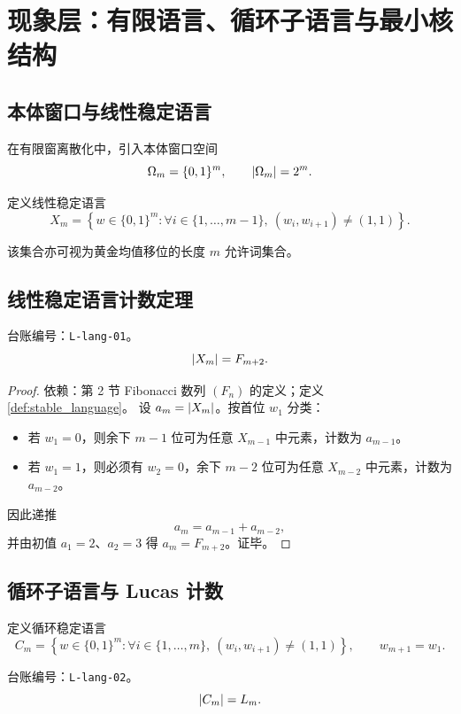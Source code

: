 \section{现象层：有限语言、循环子语言与最小核结构}

\subsection{本体窗口与线性稳定语言}

在有限窗离散化中，引入本体窗口空间
$$
\Omega_m=\{0,1\}^m,\qquad \left\lvert \Omega_m\right\rvert=2^m.
$$
\begin{definition}[线性稳定语言]\label{def:stable_language}
\MathTag 定义线性稳定语言
$$
X_m=\left\{w\in\{0,1\}^m:\forall i\in\{1,\dots,m-1\},\ (w_i,w_{i+1})\neq(1,1)\right\}.
$$
\end{definition}
该集合亦可视为黄金均值移位的长度 $m$ 允许词集合。\cite{scholarpedia_symbolic_dynamics}

\subsection{线性稳定语言计数定理}

\begin{theorem}\label{thm:Xm_count}
\MathTag
\AuditTag 台账编号：\texttt{L-lang-01}。
$$
\left\lvert X_m\right\rvert=F_{m+2}.
$$
\end{theorem}

\begin{proof}
\MathTag 依赖：第 2 节 Fibonacci 数列 $(F_n)$ 的定义；定义 \ref{def:stable_language}。
设 $a_m=\left\lvert X_m\right\rvert$。按首位 $w_1$ 分类：
\begin{itemize}
  \item 若 $w_1=0$，则余下 $m-1$ 位可为任意 $X_{m-1}$ 中元素，计数为 $a_{m-1}$。
  \item 若 $w_1=1$，则必须有 $w_2=0$，余下 $m-2$ 位可为任意 $X_{m-2}$ 中元素，计数为 $a_{m-2}$。
\end{itemize}
因此递推
$$
a_m=a_{m-1}+a_{m-2},
$$
并由初值 $a_1=2$、$a_2=3$ 得 $a_m=F_{m+2}$。证毕。
\end{proof}

\subsection{循环子语言与 Lucas 计数}

定义循环稳定语言
$$
C_m=\left\{w\in\{0,1\}^m:\forall i\in\{1,\dots,m\},\ (w_i,w_{i+1})\neq(1,1)\right\},
\qquad w_{m+1}=w_1.
$$

\begin{proposition}[循环稳定语言计数]\label{prop:Cm_Lm}
\MathTag
\AuditTag 台账编号：\texttt{L-lang-02}。
$$
\left\lvert C_m\right\rvert=L_m.
$$
\end{proposition}

